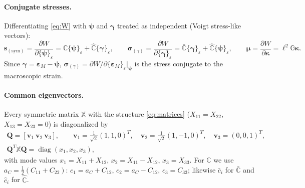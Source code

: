 \documentclass[11pt,a4paper]{article}
\newcommand{\C}{\mathbb{C}}                     %
\newcommand{\Cb}{\bar{\mathbb{C}}}              %
\newcommand{\Ch}{\hat{\mathbb{C}}}              %
\newcommand{\GG}{\mathbb{G}}                    %
\newcommand{\epsM}{\bm{\varepsilon}_{M}}
\newcommand{\bpsi}{\bm{\psi}}
\newcommand{\bgam}{\bm{\gamma}}
\newcommand{\bkap}{\bm{\kappa}}
\newcommand{\bsig}{\bm{\sigma}}
\newcommand{\bmu}{\bm{\mu}}
\newcommand{\ve}[1]{\{#1\}_{\varepsilon}}      %
\theoremstyle{plain}
\theoremstyle{remark}
\begin{document}
\paragraph{Conjugate stresses.} Differentiating \eqref{eq:W} with $\bpsi$ and $\bgam$ treated as
independent (Voigt stress-like vectors):
\begin{equation}
  \bm s_{(\mathrm{sym})}=\frac{\partial W}{\partial\ve{\bpsi}}=\C\ve{\bpsi}+\Ch\ve{\bgam},\qquad
  \bsig_{(\gamma)}=\frac{\partial W}{\partial\ve{\bgam}}=\Cb\ve{\bgam}+\Ch\ve{\bpsi},\qquad
  \bmu=\frac{\partial W}{\partial\bkap}=\ell^2\GG\bkap .
  \label{eq:stresses}
\end{equation}
Since $\bgam=\epsM-\bpsi$, $\bsig_{(\gamma)}=\partial W/\partial\ve{\epsM}|_{\bpsi}$ is the stress
conjugate to the macroscopic strain.

\paragraph{Common eigenvectors.} Every symmetric matrix $\mathbb X$ with the structure
\eqref{eq:matrices} ($X_{11}=X_{22}$, $X_{13}=X_{23}=0$) is diagonalized by
\begin{equation}
\begin{gathered}
  \bm Q=[\bm v_1\ \bm v_2\ \bm v_3],\qquad
  \bm v_1=\tfrac{1}{\sqrt2}(1,1,0)^T,\quad \bm v_2=\tfrac{1}{\sqrt2}(1,-1,0)^T,\quad \bm v_3=(0,0,1)^T,\\
  \bm Q^T\mathbb X\bm Q=\operatorname{diag}(x_1,x_2,x_3),
\end{gathered}
  \label{eq:modes}
\end{equation}
with mode values $x_1=X_{11}+X_{12}$, $x_2=X_{11}-X_{12}$, $x_3=X_{33}$. For $\C$ we use
$a_C=\tfrac12(C_{11}+C_{22})$: $c_1=a_C+C_{12}$, $c_2=a_C-C_{12}$, $c_3=C_{33}$; likewise
$\bar c_i$ for $\Cb$ and $\hat c_i$ for $\Ch$.
\end{document}
